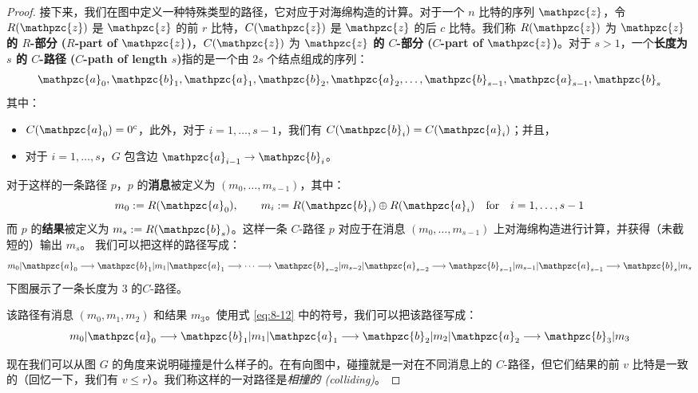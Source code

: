 \begin{proof}
接下来，我们在图中定义一种特殊类型的路径，它对应于对海绵构造的计算。对于一个 $n$ 比特的序列 $\mathpzc{z}$，令 $R(\mathpzc{z})$ 是 $\mathpzc{z}$ 的前 $r$ 比特，$C(\mathpzc{z})$ 是 $\mathpzc{z}$ 的后 $c$ 比特。我们称 $R(\mathpzc{z})$ 为 \textbf{$\mathpzc{z}$ 的 $R$-部分 ($R$-part of $\mathpzc{z}$)}，$C(\mathpzc{z})$ 为 \textbf{$\mathpzc{z}$ 的 $C$-部分 ($C$-part of $\mathpzc{z}$)}。对于 $s>1$，一个\textbf{长度为 $s$ 的 $C$-路径 ($C$-path of length $s$)}指的是一个由 $2s$ 个结点组成的序列：
\[
\mathpzc{a}_0,\mathpzc{b}_1,\mathpzc{a}_1,\mathpzc{b}_2,\mathpzc{a}_2,\dots,\mathpzc{b}_{s-1},\mathpzc{a}_{s-1},\mathpzc{b}_s
\]
其中：
\begin{itemize}
	\item $C(\mathpzc{a}_0)=0^c$，此外，对于 $i=1,\dots,s-1$，我们有 $C(\mathpzc{b}_i)=C(\mathpzc{a}_i)$；并且，
	\item 对于 $i=1,\dots,s$，$G$ 包含边 $\mathpzc{a}_{i-1}\to\mathpzc{b}_i$。
\end{itemize}
对于这样的一条路径 $p$，$p$ 的\textbf{消息}被定义为 $(m_0,\dots,m_{s-1})$，其中：
\[
m_0:=R(\mathpzc{a}_0),
\qquad
m_i:=R(\mathpzc{b}_i)\oplus R(\mathpzc{a}_i)
\quad\text{for}\quad
i=1,\dots,s-1
\]
而 $p$ 的\textbf{结果}被定义为 $m_s:=R(\mathpzc{b}_s)$。这样一条 $C$-路径 $p$ 对应于在消息 $(m_0,\dots,m_{s-1})$ 上对海绵构造进行计算，并获得（未截短的）输出 $m_s$。 我们可以把这样的路径写成：
\begin{equation}\label{eq:8-12}
m_0|\mathpzc{a}_0\longrightarrow
\mathpzc{b}_1|m_1|\mathpzc{a}_1\longrightarrow\cdots\longrightarrow
\mathpzc{b}_{s-2}|m_{s-2}|\mathpzc{a}_{s-2}\longrightarrow
\mathpzc{b}_{s-1}|m_{s-1}|\mathpzc{a}_{s-1}\longrightarrow
\mathpzc{b}_{s}|m_{s}
\end{equation}
下图展示了一条长度为 $3$ 的$C$-路径。

\begin{figure*}[h!]
  \centering
  
\end{figure*}

\noindent
该路径有消息 $(m_0,m_1,m_2)$ 和结果 $m_3$。使用式 \ref{eq:8-12} 中的符号，我们可以把该路径写成：
\[
m_0|\mathpzc{a}_0\longrightarrow
\mathpzc{b}_1|m_1|\mathpzc{a}_1\longrightarrow
\mathpzc{b}_2|m_2|\mathpzc{a}_2\longrightarrow
\mathpzc{b}_3|m_3
\]

现在我们可以从图 $G$ 的角度来说明碰撞是什么样子的。在有向图中，碰撞就是一对在不同消息上的 $C$-路径，但它们结果的前 $v$ 比特是一致的（回忆一下，我们有 $v\leq r$）。我们称这样的一对路径是\emph{相撞的 (colliding)}。


\end{proof}

